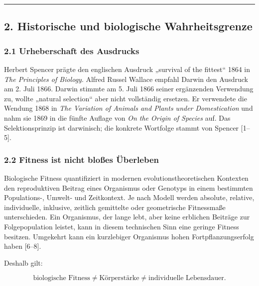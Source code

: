 \documentclass[
  10pt,
  a4paper,
]{article}
\begin{document}
\begin{center}\rule{0.5\linewidth}{0.5pt}\end{center}

\hypertarget{historische-und-biologische-wahrheitsgrenze}{%
\subsection{2. Historische und biologische
Wahrheitsgrenze}\label{historische-und-biologische-wahrheitsgrenze}}

\hypertarget{urheberschaft-des-ausdrucks}{%
\subsubsection{2.1 Urheberschaft des
Ausdrucks}\label{urheberschaft-des-ausdrucks}}

Herbert Spencer prägte den englischen Ausdruck „survival of the
fittest`` 1864 in \emph{The Principles of Biology}. Alfred Russel
Wallace empfahl Darwin den Ausdruck am 2. Juli 1866. Darwin stimmte am
5. Juli 1866 seiner ergänzenden Verwendung zu, wollte „natural
selection`` aber nicht vollständig ersetzen. Er verwendete die Wendung
1868 in \emph{The Variation of Animals and Plants under Domestication}
und nahm sie 1869 in die fünfte Auflage von \emph{On the Origin of
Species} auf. Das Selektionsprinzip ist darwinisch; die konkrete
Wortfolge stammt von Spencer {[}1--5{]}.

\hypertarget{fitness-ist-nicht-blouxdfes-uxfcberleben}{%
\subsubsection{2.2 Fitness ist nicht bloßes
Überleben}\label{fitness-ist-nicht-blouxdfes-uxfcberleben}}

Biologische Fitness quantifiziert in modernen evolutionstheoretischen
Kontexten den reproduktiven Beitrag eines Organismus oder Genotyps in
einem bestimmten Populations-, Umwelt- und Zeitkontext. Je nach Modell
werden absolute, relative, individuelle, inklusive, zeitlich gemittelte
oder geometrische Fitnessmaße unterschieden. Ein Organismus, der lange
lebt, aber keine erblichen Beiträge zur Folgepopulation leistet, kann in
diesem technischen Sinn eine geringe Fitness besitzen. Umgekehrt kann
ein kurzlebiger Organismus hohen Fortpflanzungserfolg haben {[}6--8{]}.

Deshalb gilt:

\[
\text{biologische Fitness}
\neq
\text{Körperstärke}
\neq
\text{individuelle Lebensdauer}.
\]
\end{document}
